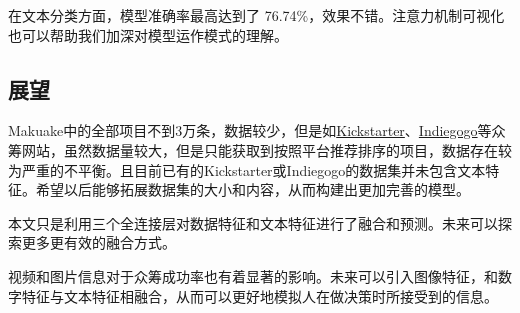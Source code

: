 \documentclass[lang=cn,a4paper]{elegantpaper}
\begin{document}
在文本分类方面，模型准确率最高达到了 76.74\%，效果不错。注意力机制可视化也可以帮助我们加深对模型运作模式的理解。

\subsection{展望}
Makuake中的全部项目不到3万条，数据较少，但是如\href{https://www.kickstarter.com/}{Kickstarter}、\href{https://www.indiegogo.com/}{Indiegogo}等众筹网站，虽然数据量较大，但是只能获取到按照平台推荐排序的项目，数据存在较为严重的不平衡。且目前已有的Kickstarter或Indiegogo的数据集并未包含文本特征。希望以后能够拓展数据集的大小和内容，从而构建出更加完善的模型。

本文只是利用三个全连接层对数据特征和文本特征进行了融合和预测。未来可以探索更多更有效的融合方式。

视频和图片信息对于众筹成功率也有着显著的影响。未来可以引入图像特征，和数字特征与文本特征相融合，从而可以更好地模拟人在做决策时所接受到的信息。


\nocite{*}
\printbibliography[heading=bibintoc, title=\ebibname]
\end{document}
